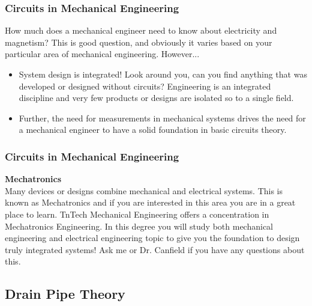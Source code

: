 \documentclass[fleqn]{ltx-talk} %
\newcommand{\sectionIIIsubsectionItitle}{Circuits in Mechanical Engineering}
\newcommand{\sectionIIIsubsectionIItitle}{Drain Pipe Theory}
\begin{document}
			\begin{frame}
				\frametitle{\sectionIIIsubsectionItitle}

				How much does a mechanical engineer need to know about electricity and magnetism? This is good question, and obviously it varies based on your particular area of mechanical engineering. However...
	
				\begin{itemize}
					
					\item System design is integrated! Look around you, can you find anything that was developed or designed without circuits? Engineering is an integrated discipline and very few products or designs are isolated so to a single field.
					
					\item Further, the need for measurements in mechanical systems drives the need for a mechanical engineer to have a solid foundation in basic circuits theory.
						
				\end{itemize}

				
			\end{frame}

			\begin{frame}
				\frametitle{\sectionIIIsubsectionItitle}
				
				{\bfseries Mechatronics} \\
				Many devices or designs combine mechanical and electrical systems. This is known as Mechatronics and if you are interested in this area you are in a great place to learn. TnTech Mechanical Engineering offers a concentration in Mechatronics Engineering. In this degree you will study both mechanical engineering and electrical engineering topic to give you the foundation to design truly integrated systems! Ask me or Dr. Canfield if you have any questions about this. 

			\end{frame}

		\subsection{\sectionIIIsubsectionIItitle}\label{sectionIIIsubsectionII}	
\end{document}
